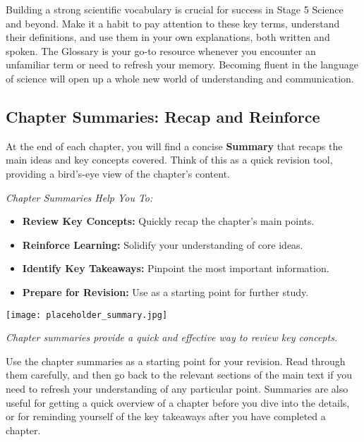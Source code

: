 Building a strong scientific vocabulary is crucial for success in Stage 5 Science and beyond.  Make it a habit to pay attention to these key terms, understand their definitions, and use them in your own explanations, both written and spoken.  The Glossary is your go-to resource whenever you encounter an unfamiliar term or need to refresh your memory.  Becoming fluent in the language of science will open up a whole new world of understanding and communication.

\FloatBarrier

\subsection{Chapter Summaries:  Recap and Reinforce}

At the end of each chapter, you will find a concise \textbf{Summary} that recaps the main ideas and key concepts covered.  Think of this as a quick revision tool, providing a bird's-eye view of the chapter's content.

\begin{marginnote}
\textit{Chapter Summaries Help You To:}
\begin{itemize}
    \item \textbf{Review Key Concepts:}  Quickly recap the chapter's main points.
    \item \textbf{Reinforce Learning:}  Solidify your understanding of core ideas.
    \item \textbf{Identify Key Takeaways:}  Pinpoint the most important information.
    \item \textbf{Prepare for Revision:}  Use as a starting point for further study.
\end{itemize}
\end{marginnote}

\begin{marginfigure}[0pt]
\texttt{[image: placeholder\_summary.jpg]}
\caption*{}
\textit{Chapter summaries provide a quick and effective way to review key concepts.}
\end{marginfigure}

Use the chapter summaries as a starting point for your revision.  Read through them carefully, and then go back to the relevant sections of the main text if you need to refresh your understanding of any particular point.  Summaries are also useful for getting a quick overview of a chapter before you dive into the details, or for reminding yourself of the key takeaways after you have completed a chapter.

